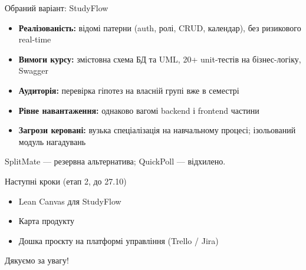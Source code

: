 \documentclass[aspectratio=169,11pt]{beamer}
\begin{document}
\begin{frame}{Обраний варіант: StudyFlow}
\begin{itemize}
  \item \textbf{Реалізованість:} відомі патерни (auth, ролі, CRUD, календар), без ризикового real-time
  \item \textbf{Вимоги курсу:} змістовна схема БД та UML, 20+ unit-тестів на бізнес-логіку, Swagger
  \item \textbf{Аудиторія:} перевірка гіпотез на власній групі вже в семестрі
  \item \textbf{Рівне навантаження:} однаково вагомі backend і frontend частини
  \item \textbf{Загрози керовані:} вузька спеціалізація на навчальному процесі; ізольований модуль нагадувань
\end{itemize}
\vspace{4pt}
SplitMate — резервна альтернатива; QuickPoll — відхилено.
\end{frame}

\begin{frame}{Наступні кроки (етап 2, до 27.10)}
\begin{itemize}
  \item Lean Canvas для StudyFlow
  \item Карта продукту
  \item Дошка проєкту на платформі управління (Trello / Jira)
\end{itemize}
\vfill
\centering \large Дякуємо за увагу!
\end{frame}
\end{document}
